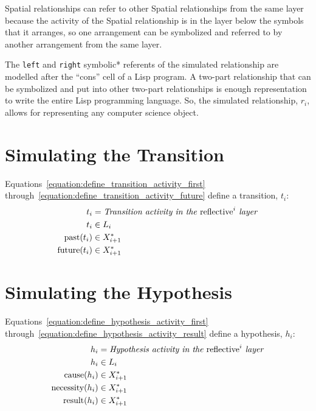Spatial relationships can refer to other Spatial relationships from
the same layer because the activity of the Spatial relationship is in
the layer below the symbols that it arranges, so one arrangement can
be symbolized and referred to by another arrangement from the same
layer.

The {\tt left} and {\tt right} symbolic* referents of the simulated
relationship are modelled after the ``cons'' cell of a Lisp program.
A two-part relationship that can be symbolized and put into other
two-part relationships is enough representation to write the entire
Lisp programming language.  So, the simulated relationship, $r_i$,
allows for representing any computer science object.

\section{Simulating the Transition}

Equations~\ref{equation:define_transition_activity_first}
through~\ref{equation:define_transition_activity_future} define a
transition, $t_i$:
\begin{align}
\label{equation:define_transition_activity_first}
               t_i &= \text{\emph{Transition activity in the} reflective}^i\text{\emph{ layer}} \\
               t_i &\in L_i \\
\label{equation:define_transition_activity_past}
  \text{past}(t_i) &\in X^*_{i+1} \\
\label{equation:define_transition_activity_future}
\text{future}(t_i) &\in X^*_{i+1}
\end{align}

\section{Simulating the Hypothesis}

Equations~\ref{equation:define_hypothesis_activity_first}
through~\ref{equation:define_hypothesis_activity_result} define a
hypothesis, $h_i$:
\begin{align}
\label{equation:define_hypothesis_activity_first}
                  h_i &= \text{\emph{Hypothesis activity in the} reflective}^i\text{\emph{ layer}} \\
                  h_i &\in L_i \\
\label{equation:define_hypothesis_activity_cause}
    \text{cause}(h_i) &\in X^*_{i+1} \\
\label{equation:define_hypothesis_activity_necessity}
\text{necessity}(h_i) &\in X^*_{i+1} \\
\label{equation:define_hypothesis_activity_result}
   \text{result}(h_i) &\in X^*_{i+1}
\end{align}

